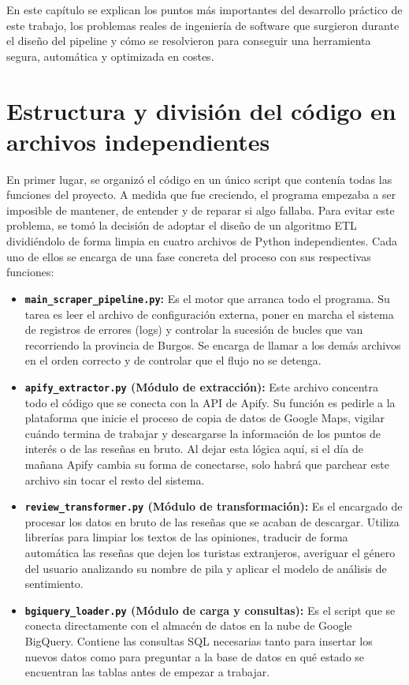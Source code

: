 
En este capítulo se explican los puntos más importantes del desarrollo práctico de este trabajo, los problemas reales de ingeniería de software que surgieron durante el diseño del pipeline y cómo se resolvieron para conseguir una herramienta segura, automática y optimizada en costes.

\section{Estructura y división del código en archivos independientes}
En primer lugar, se organizó el código en un único script que contenía todas las funciones del proyecto. A medida que fue creciendo, el programa empezaba a ser imposible de mantener, de entender y de reparar si algo fallaba. Para evitar este problema, se tomó la decisión de adoptar el diseño de un algoritmo ETL dividiéndolo de forma limpia en cuatro archivos de Python independientes. Cada uno de ellos se encarga de una fase concreta del proceso con sus respectivas funciones:

\begin{itemize}
    \item \textbf{\texttt{main\_scraper\_pipeline.py}:} Es el motor que arranca todo el programa. Su tarea es leer el archivo de configuración externa, poner en marcha el sistema de registros de errores (logs) y controlar la sucesión de bucles que van recorriendo la provincia de Burgos. Se encarga de llamar a los demás archivos en el orden correcto y de controlar que el flujo no se detenga.
    
    \item \textbf{\texttt{apify\_extractor.py} (Módulo de extracción):} Este archivo concentra todo el código que se conecta con la API de Apify. Su función es pedirle a la plataforma que inicie el proceso de copia de datos de Google Maps, vigilar cuándo termina de trabajar y descargarse la información de los puntos de interés o de las reseñas en bruto. Al dejar esta lógica aquí, si el día de mañana Apify cambia su forma de conectarse, solo habrá que parchear este archivo sin tocar el resto del sistema.
    
    \item \textbf{\texttt{review\_transformer.py} (Módulo de transformación):} Es el encargado de procesar los datos en bruto de las reseñas que se acaban de descargar. Utiliza librerías para limpiar los textos de las opiniones, traducir de forma automática las reseñas que dejen los turistas extranjeros, averiguar el género del usuario analizando su nombre de pila y aplicar el modelo de análisis de sentimiento.
    
    \item \textbf{\texttt{bgiquery\_loader.py} (Módulo de carga y consultas):} Es el script que se conecta directamente con el almacén de datos en la nube de Google BigQuery. Contiene las consultas SQL necesarias tanto para insertar los nuevos datos como para preguntar a la base de datos en qué estado se encuentran las tablas antes de empezar a trabajar.
\end{itemize}

